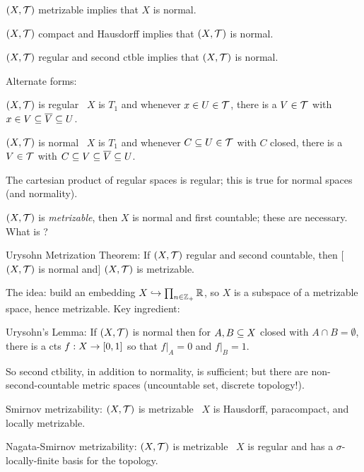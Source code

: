 \documentclass[12pt]{article}
\begin{document}
\ssk

$(X,{\mathcal T})$ metrizable implies that $X$ is normal.

\ssk

$(X,{\mathcal T})$ compact and Hausdorff implies that $(X,{\mathcal T})$ is normal.

\ssk

$(X,{\mathcal T})$ regular and second ctble implies that $(X,{\mathcal T})$ is normal.

\ssk

Alternate forms: 

\ssk

$(X,{\mathcal T})$ is regular \lra\ $X$ is $T_1$ and whenever $x\in U\in{\mathcal T}$, there is a $V\in {\mathcal T}$ with 
$x\in V\subseteq \overline{V}\subseteq U$.

\ssk

$(X,{\mathcal T})$ is normal \lra\ $X$ is $T_1$ and whenever $C\subseteq U\in{\mathcal T}$ with $C$ closed, there is a $V\in {\mathcal T}$ with 
$C\subseteq V\subseteq \overline{V}\subseteq U$.

\ssk

The cartesian product of regular spaces is regular; this is  true for normal spaces (and normality).

\msk

$(X,{\mathcal T})$ is {\it metrizable}, then $X$ is normal and first countable; these are necessary. What is 
?

\ssk

Urysohn Metrization Theorem: If $(X,{\mathcal T})$ regular and second countable, then
[$(X,{\mathcal T})$ is normal and] $(X,{\mathcal T})$ is metrizable.

\ssk

The idea: build an embedding $X\hookrightarrow \prod_{n\in{\mathbb Z}_+}{\mathbb R}$, so $X$ is a subspace of 
a metrizable space, hence metrizable. Key ingredient:

\ssk

Urysohn's Lemma: If $(X,{\mathcal T})$ is normal then for $A,B\subseteq X$ closed with $A\cap B=\emptyset$,
there is a cts $f:X\rightarrow [0,1]$ so that $f|_A=0$ and $f|_B=1$.

\ssk

So second ctbility, in addition to normality, is sufficient; but there are non-second-countable metric
spaces (uncountable set, discrete topology!). 

\ssk

Smirnov metrizability: $(X,{\mathcal T})$ is metrizable \lra\ $X$ is Hausdorff, paracompact, and
locally metrizable.

\ssk

Nagata-Smirnov metrizability: $(X,{\mathcal T})$ is metrizable \lra\ $X$ is regular and has a 
$\sigma$-locally-finite basis for the topology.
\end{document}
